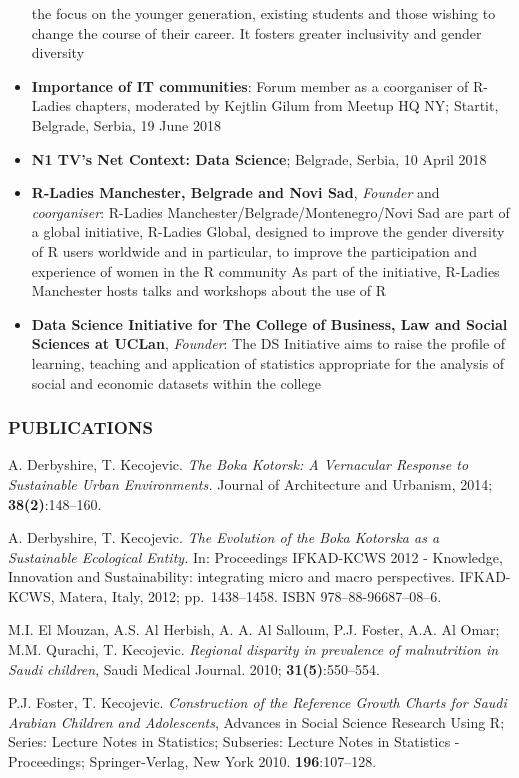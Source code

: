 \documentclass[
]{article}
\begin{document}
\begin{itemize}
  the focus on the younger generation, existing students and those
  wishing to change the course of their career. It fosters greater
  inclusivity and gender diversity
\item
  \textbf{Importance of IT communities}: Forum member as a coorganiser
  of R-Ladies chapters, moderated by Kejtlin Gilum from Meetup HQ NY;
  Startit, Belgrade, Serbia, 19 June 2018
\item
  \textbf{N1 TV's Net Context: Data Science}; Belgrade, Serbia, 10 April
  2018
\item
  \textbf{R-Ladies Manchester, Belgrade and Novi Sad}, \emph{Founder}
  and \emph{coorganiser}: R-Ladies Manchester/Belgrade/Montenegro/Novi
  Sad are part of a global initiative, R-Ladies Global, designed to
  improve the gender diversity of R users worldwide and in particular,
  to improve the participation and experience of women in the R
  community As part of the initiative, R-Ladies Manchester hosts talks
  and workshops about the use of R
\item
  \textbf{Data Science Initiative for The College of Business, Law and
  Social Sciences at UCLan}, \emph{Founder}: The DS Initiative aims to
  raise the profile of learning, teaching and application of statistics
  appropriate for the analysis of social and economic datasets within
  the college
\end{itemize}

\hypertarget{publications}{%
\subsubsection{PUBLICATIONS}\label{publications}}

A. Derbyshire, T. Kecojevic. \emph{The Boka Kotorsk: A Vernacular
Response to Sustainable Urban Environments.} Journal of Architecture and
Urbanism, 2014; \textbf{38(2)}:148--160.

A. Derbyshire, T. Kecojevic. \emph{The Evolution of the Boka Kotorska as
a Sustainable Ecological Entity.} In: Proceedings IFKAD-KCWS 2012 -
Knowledge, Innovation and Sustainability: integrating micro and macro
perspectives. IFKAD-KCWS, Matera, Italy, 2012; pp.~1438--1458. ISBN
978--88-96687--08--6.

M.I. El Mouzan, A.S. Al Herbish, A. A. Al Salloum, P.J. Foster, A.A. Al
Omar; M.M. Qurachi, T. Kecojevic. \emph{Regional disparity in prevalence
of malnutrition in Saudi children}, Saudi Medical Journal. 2010;
\textbf{31(5)}:550--554.

P.J. Foster, T. Kecojevic. \emph{Construction of the Reference Growth
Charts for Saudi Arabian Children and Adolescents}, Advances in Social
Science Research Using R; Series: Lecture Notes in Statistics;
Subseries: Lecture Notes in Statistics - Proceedings; Springer-Verlag,
New York 2010. \textbf{196}:107--128.
\end{document}
